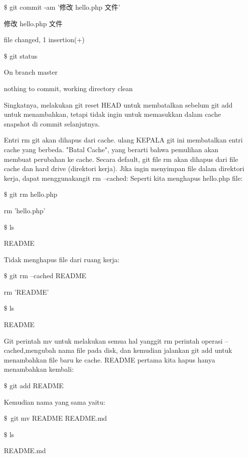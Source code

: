 \noindent 
{\fontsize{10pt}{10pt}\selectfont  $  \$  $ git commit -am '修改 hello.php 文件'} \par
\noindent 
{\fontsize{10pt}{10pt}\selectfont [master 760f74d] 修改 hello.php 文件} \par
\noindent 
{\fontsize{10pt}{10pt} file changed, 1 insertion(+)} \par
\noindent 
{\fontsize{10pt}{10pt}\selectfont  $  \$  $ git status} \par
\noindent 
{\fontsize{10pt}{10pt}\selectfont On branch master} \par
\noindent 
{\fontsize{10pt}{10pt}\selectfont nothing to commit, working directory clean} \par
\vspace{10pt}
Singkatnya, melakukan git reset HEAD untuk membatalkan sebelum git add untuk menambahkan, tetapi tidak ingin untuk memasukkan dalam cache snapshot di commit selanjutnya. \par
Entri rm git akan dihapus dari cache. ulang KEPALA git ini membatalkan entri cache yang berbeda. "Batal Cache", yang berarti bahwa pemulihan akan membuat perubahan ke cache.  Secara default, git file rm akan dihapus dari file cache dan hard drive  (direktori kerja). Jika ingin menyimpan file dalam direktori kerja, dapat menggunakangit rm --cached: Seperti kita menghapus hello.php file:  \par
\noindent 
{\fontsize{10pt}{10pt}\selectfont  $  \$  $ git rm hello.php } \par
\noindent 
{\fontsize{10pt}{10pt}\selectfont rm 'hello.php'} \par
\noindent 
{\fontsize{10pt}{10pt}\selectfont  $  \$  $ ls} \par
\noindent 
{\fontsize{10pt}{10pt}\selectfont README} \par
\noindent 
\vspace{12pt}
\noindent 
Tidak menghapus file dari ruang kerja:  \par
\noindent 
{\fontsize{10pt}{10pt}\selectfont  $  \$  $ git rm --cached README } \par
\noindent 
{\fontsize{10pt}{10pt}\selectfont rm 'README'} \par
\noindent 
{\fontsize{10pt}{10pt}\selectfont  $  \$  $ ls} \par
\noindent 
{\fontsize{10pt}{10pt}\selectfont README} \par
Git perintah mv untuk melakukan semua hal yanggit rm perintah operasi --cached,mengubah nama file pada disk, dan kemudian jalankan git add untuk menambahkan file baru ke cache.  README pertama kita hapus hanya menambahkan kembali:  \par
\noindent 
{\fontsize{10pt}{10pt}\selectfont  $  \$  $ git add README } \par
\vspace{12pt}
\noindent 
Kemudian nama yang sama yaitu:  \par
\noindent 
{\fontsize{10pt}{10pt}\selectfont  $  \$  $~git mv README  README.md} \par
\noindent 
{\fontsize{10pt}{10pt}\selectfont  $  \$  $ ls} \par
\noindent 
{\fontsize{10pt}{10pt}\selectfont README.md} \par
\vspace{12pt}